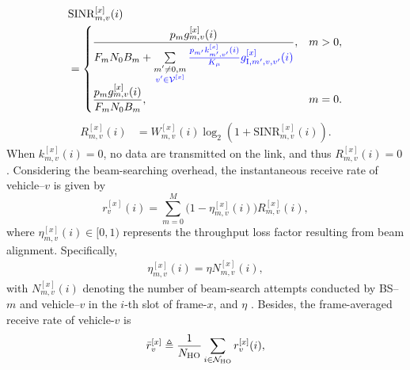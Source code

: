 \documentclass[10pt,journal,letterpaper]{journal_template/IEEEtran}
\newcommand{\rev}[1]{\textcolor{revisioncolor}{{}#1}}
\newif\ifshowdeletions
\newcommand{\currentdel}[1]{\ifshowdeletions\textcolor{deletioncolor}{\sout{#1}}\fi}
\theoremstyle{remark}
\begin{document}
\currentdel{By substituting the expressions for power, bandwidth and interference, the SINR term simplifies to}
\begin{equation}
    \begin{aligned}
        & \mathrm{SINR}_{m,v}^{[x]}(i) \\
        & = 
        \begin{cases}
            \displaystyle
            \frac{ p_m g_{m,v}^{[x]}(i)}
            {F_m N_0 B_m 
             + \sum\limits_{\substack{m'\neq 0,m\\\rev{v'\in\mathcal V^{[x]}}}}
               \currentdel{\ensuremath{\frac{k_{m'}^{[x]}(i)}{K_\mu}p_{m'}g_{{\rm I},m',v}^{[x]}(i)}}\rev{\frac{p_{m'}k_{m',v'}^{[x]}(i)}{K_\mu}
               g_{{\rm I},m',v,v'}^{[x]}(i)}}, 
            & m>0, \\[2ex]
            \displaystyle
            \frac{ p_m g_{m,v}^{[x]}(i)}{F_m N_0 B_m}, 
            & m=0.
        \end{cases}
    \end{aligned}
    \label{eq:SINR simplified}
\end{equation}
\currentdel{Based on the Shannon-Hartley theorem, the instantaneous achievable rate of this link is expressed as}
\begin{align}
    R_{m,v}^{[x]}(i) & = W_{m,v}^{[x]}(i) \log_2 \left( 1 + \mathrm{SINR}_{m,v}^{[x]}(i) \right).
    \label{eq:instantaneous link achievable rate}
\end{align}
\rev{When $k_{m,v}^{[x]}(i)=0$, no data are transmitted on the link, and thus $R_{m,v}^{[x]}(i)=0$.}
Considering the beam-searching overhead, the instantaneous receive rate of vehicle–$v$ is given by
\begin{equation}
    r_{v}^{[x]}(i) = \sum_{m=0}^M \bigl(1-\eta_{m,v}^{[x]}(i) \bigl)R_{m,v}^{[x]}(i),
    \label{eq:instantaneous veh receive rate}
\end{equation}
where $\eta_{m,v}^{[x]}(i) \in [0,1)$ represents the throughput loss factor resulting from beam alignment. Specifically,
\begin{align}
\eta_{m,v}^{[x]}(i) = \eta N_{m,v}^{[x]}(i),
\end{align}
with $N_{m,v}^{[x]}(i)$ denoting the number of beam-search attempts conducted by BS–$m$ and vehicle–$v$ in the $i$-th slot of frame-$x$, and $\eta$ \currentdel{representing the ratio of OFDM symbols consumed by once beam search to the total number of OFDM symbols per slot}.
Besides, the frame-averaged receive rate of vehicle-$v$ is 
\begin{equation}
    \bar{r}_v^{[x]} \triangleq  \frac{1}{N_{\rm HO}}\sum_{ i \in \mathcal{N}_{\rm HO}}r_{v}^{[x]}(i),
    \label{eq:frame-averaged veh receive rate}
\end{equation}
\end{document}
